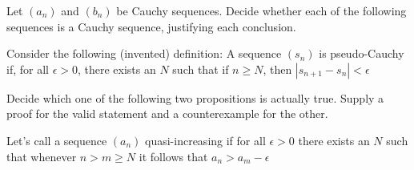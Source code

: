 \begin{exercise}
  Let $\left(a_{n}\right)$ and $\left(b_{n}\right)$ be Cauchy sequences. Decide whether each of the following sequences is a Cauchy sequence, justifying each conclusion.
\end{exercise}

\begin{solution}
  \enum{
  \item \TODO
  \item \TODO
  \item \TODO
  }
\end{solution}

\begin{exercise}
  Consider the following (invented) definition: A sequence $\left(s_{n}\right)$ is pseudo-Cauchy if, for all $\epsilon>0$, there exists an $N$ such that if $n \geq N$, then $\left|s_{n+1}-s_{n}\right|<\epsilon$

  Decide which one of the following two propositions is actually true. Supply a proof for the valid statement and a counterexample for the other.
\end{exercise}

\begin{solution}
  \TODO
\end{solution}

\begin{exercise}
  Let's call a sequence $\left(a_{n}\right)$ quasi-increasing if for all $\epsilon>0$ there exists an $N$ such that whenever $n>m \geq N$ it follows that $a_{n}>a_{m}-\epsilon$
\end{exercise}

